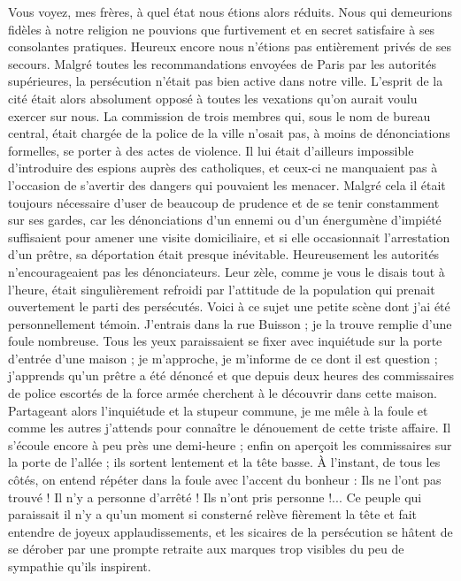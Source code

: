 Vous voyez, mes frères, à quel état nous étions alors réduits. Nous qui demeurions fidèles à notre religion ne pouvions que furtivement et en secret satisfaire à ses consolantes pratiques. Heureux encore nous n'étions pas entièrement privés de ses secours. Malgré toutes les recommandations envoyées de Paris par les autorités supérieures, la persécution n'était pas bien active dans notre ville. L'esprit de la cité était alors absolument opposé à toutes les vexations qu'on aurait voulu exercer sur nous. La commission de trois membres qui, sous le nom de bureau central, était chargée de la police de la ville n'osait pas, à moins de dénonciations formelles, se porter à des actes de violence. Il lui était d'ailleurs impossible d'introduire des espions auprès des catholiques, et ceux-ci ne manquaient pas à l'occasion de s'avertir des dangers qui pouvaient les menacer. Malgré cela il était toujours nécessaire
d'user de beaucoup de prudence et de se tenir constamment sur ses gardes, car les dénonciations d'un ennemi ou d'un énergumène d'impiété suffisaient pour amener une visite domiciliaire, et si elle occasionnait l'arrestation d'un prêtre, sa déportation était presque inévitable. Heureusement les autorités n'encourageaient pas les dénonciateurs. Leur zèle, comme je vous le disais tout à l'heure, était singulièrement refroidi par l'attitude de la population qui prenait ouvertement le parti des persécutés. Voici à ce sujet une petite scène dont j'ai été personnellement témoin. J'entrais dans la rue Buisson ; je la trouve remplie d'une foule nombreuse. Tous les yeux paraissaient se fixer avec inquiétude sur la porte d'entrée d'une maison ; je m'approche, je m'informe de ce dont il est question ; j'apprends qu'un prêtre a été dénoncé et que depuis deux heures des commissaires de police escortés de la force armée cherchent à le découvrir dans cette maison. Partageant alors l'inquiétude et la stupeur commune, je me mêle à la foule et comme les autres j'attends pour connaître le dénouement de cette triste affaire. Il s'écoule encore à peu près une demi-heure ; enfin on aperçoit les commissaires sur la porte de l'allée ; ils sortent lentement et la tête basse. À l'instant, de tous les côtés, on entend répéter dans la foule avec l'accent du bonheur : Ils ne l'ont pas trouvé ! Il n'y a personne d'arrêté ! Ils n'ont pris personne !... Ce peuple qui paraissait il n'y a qu'un moment si consterné relève fièrement la tête et fait entendre
de joyeux applaudissements, et les sicaires de la persécution se hâtent de se dérober par une prompte retraite aux marques trop visibles du peu de sympathie qu'ils inspirent.

